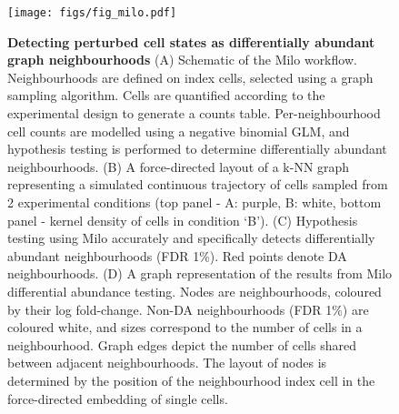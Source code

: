 \documentclass[
  10pt,
]{article}
\author{}
\date{\vspace{-2.5em}}
\begin{document}

\newpage

\begin{figure}
\centering
\texttt{[image: figs/fig\_milo.pdf]}
\caption{\label{fig:fig-1}\textbf{Detecting perturbed cell states as differentially abundant graph neighbourhoods}
(A) Schematic of the Milo workflow.
Neighbourhoods are defined on index cells, selected using a graph sampling algorithm.
Cells are quantified according to the experimental design to generate a counts table. Per-neighbourhood cell counts are modelled using a negative binomial GLM, and hypothesis testing is performed to determine differentially abundant neighbourhoods.
(B) A force-directed layout of a k-NN graph representing a simulated continuous trajectory of cells sampled from 2 experimental conditions (top panel - A: purple, B: white, bottom panel - kernel density of cells in condition `B').
(C) Hypothesis testing using Milo accurately and specifically detects differentially abundant neighbourhoods (FDR 1\%). Red points denote DA neighbourhoods.
(D)
A graph representation of the results from Milo differential abundance testing. Nodes are neighbourhoods, coloured by their log fold-change. Non-DA neighbourhoods (FDR 1\%) are coloured white, and sizes correspond to the number of cells in a neighbourhood. Graph edges depict the number of cells shared between adjacent neighbourhoods. The layout of nodes is determined by the position of the neighbourhood index cell in the force-directed embedding of single cells.}
\end{figure}
\end{document}
